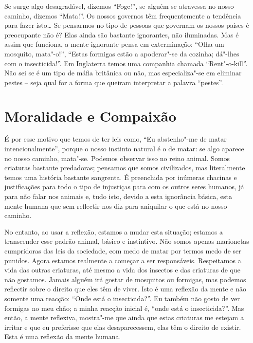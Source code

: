 Se surge algo desagradável, dizemos “Foge!”, se alguém se atravessa no nosso
caminho, dizemos “Mata!”. Os nossos governos têm frequentemente a tendência para fazer
isto\ldots{} Se pensarmos no tipo de pessoas que governam os nossos países é
preocupante não é? Elas ainda são bastante ignorantes, não iluminadas. Mas é
assim que funciona, a mente ignorante pensa em exterminação: “Olha um mosquito,
mata"-o!”, “Estas formigas estão a apoderar"-se da cozinha; dá"-lhes com o
insecticida!”. Em Inglaterra temos uma companhia chamada “Rent"-o-kill”. Não sei
se é um tipo de máfia britânica ou não, mas especializa"-se em eliminar pestes –
seja qual for a forma que queiram interpretar a palavra “pestes”.

\section{Moralidade e Compaixão}

É por esse motivo que temos de ter leis como, “Eu abstenho"-me de matar
intencionalmente”, porque o nosso instinto natural é o de matar: se algo aparece no
nosso caminho, mata"-se. Podemos observar isso no reino animal. Somos criaturas
bastante predadoras; pensamos que somos civilizados, mas literalmente temos uma
história bastante sangrenta. É preenchida por inúmeras chacinas e justificações
para todo o tipo de injustiças para com os outros seres humanos, já para não
falar nos animais e, tudo isto, devido a esta ignorância básica, esta mente
humana que sem reflectir nos diz para aniquilar o que está no nosso caminho.

No entanto, ao usar a reflexão, estamos a mudar esta situação; estamos a
transcender esse padrão animal, básico e instintivo. Não somos apenas marionetas
cumpridoras das leis da sociedade, com medo de matar por termos medo de ser
punidos. Agora estamos realmente a começar a ser responsáveis. Respeitamos a
vida das outras criaturas, até mesmo a vida dos insectos e das criaturas de que
não gostamos. Jamais alguém irá gostar de mosquitos ou formigas, mas podemos
reflectir sobre o direito que eles têm de viver. Isto é uma reflexão da mente e
não somente uma reacção: “Onde está o insecticida?”. Eu também não gosto de ver
formigas no meu chão; a minha reacção inicial é, “onde está o insecticida?”. Mas
então, a mente reflexiva, mostra"-me que ainda que estas criaturas me estejam a
irritar e que eu preferisse que elas desaparecessem, elas têm o direito de existir.
Esta é uma reflexão da mente humana.

